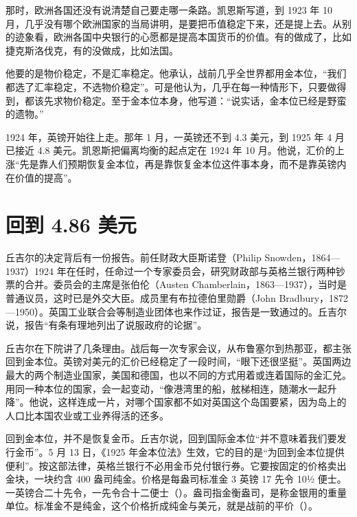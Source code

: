 那时，欧洲各国还没有说清楚自己要走哪一条路。凯恩斯写道，到 1923 年 10 月，几乎没有哪个欧洲国家的当局讲明，是要把币值稳定下来，还是提上去\cite{keynes1923}。从别的迹象看，欧洲各国中央银行的心愿都是提高本国货币的价值。有的做成了，比如捷克斯洛伐克，有的没做成，比如法国\cite{keynes1923}。

他要的是物价稳定，不是汇率稳定。他承认，战前几乎全世界都用金本位，“我们都选了汇率稳定，不选物价稳定”\cite{keynes1923}。可是他认为，几乎在每一种情形下，只要做得到，都该先求物价稳定\cite{keynes1923}。至于金本位本身，他写道：“说实话，金本位已经是野蛮的遗物。”\cite{keynes1923}

1924 年，英镑开始往上走。那年 1 月，一英镑还不到 4.3 美元，到 1925 年 4 月已接近 4.8 美元\cite{boe2017}。凯恩斯把偏离均衡的起点定在 1924 年 10 月。他说，汇价的上涨“先是靠人们预期恢复金本位，再是靠恢复金本位这件事本身，而不是靠英镑内在价值的提高”\cite{keynes1925}。

\section{回到 4.86 美元}\label{sec:interwar-parity}

丘吉尔的决定背后有一份报告。前任财政大臣斯诺登（Philip Snowden，1864—1937）1924 年在任时，任命过一个专家委员会，研究财政部与英格兰银行两种钞票的合并\cite{hansard1925,hansardpeople27}。委员会的主席是张伯伦（Austen Chamberlain，1863—1937），当时是普通议员，这时已是外交大臣。成员里有布拉德伯里勋爵（John Bradbury，1872—1950）\cite{hansard1925,hansardpeople27}。英国工业联合会等制造业团体也来作过证，报告是一致通过的\cite{hansard1925}。丘吉尔说，报告“有条有理地列出了说服政府的论据”\cite{hansard1925}。

丘吉尔在下院讲了几条理由。战后每一次专家会议，从布鲁塞尔到热那亚，都主张回到金本位\cite{hansard1925}。英镑对美元的汇价已经稳定了一段时间，“眼下还很坚挺”\cite{hansard1925}。英国两边最大的两个制造业国家，美国和德国，也以不同的方式用着或连着国际的金汇兑\cite{hansard1925}。用同一种本位的国家，会一起变动，“像港湾里的船，舷梯相连，随潮水一起升降”\cite{hansard1925}。他说，这样连成一片，对哪个国家都不如对英国这个岛国要紧，因为岛上的人口比本国农业或工业养得活的还多\cite{hansard1925}。

回到金本位，并不是恢复金币。丘吉尔说，回到国际金本位“并不意味着我们要发行金币”\cite{hansard1925}。5 月 13 日，《1925 年金本位法》生效，它的目的是“为回到金本位提供便利”\cite{gsa1925}。按这部法律，英格兰银行不必用金币兑付银行券。它要按固定的价格卖出金块，一块约含 400 盎司纯金\cite{gsa1925}。价格是每盎司标准金 3 英镑 17 先令 10½ 便士\cite{gsa1925,hansard1925}。一英镑合二十先令，一先令合十二便士（）。盎司指金衡盎司，是称金银用的重量单位。标准金不是纯金，这个价格折成纯金与美元，就是战前的平价（）。

